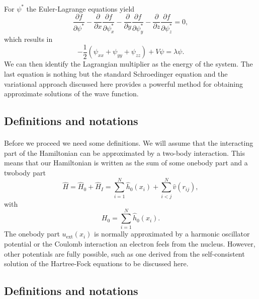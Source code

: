 \documentclass[%
twoside,                 %
final,                   %
10pt]{article}
\begin{document}
\paragraph{}
For $\psi^*$ the Euler-Lagrange  equations yield
\[
\frac{\partial f}{\partial \psi^*}- \frac{\partial }{\partial x}\frac{\partial f}{\partial \psi^*_x}-\frac{\partial }{\partial y}\frac{\partial f}{\partial \psi^*_y}-\frac{\partial }{\partial z}\frac{\partial f}{\partial \psi^*_z}=0,
\] 
which results in 
\[
    -\frac{1}{2}(\psi_{xx}+\psi_{yy}+\psi_{zz})+V\psi=\lambda \psi.
\]
We can then identify the  Lagrangian multiplier as the energy of the system. The last equation is 
nothing but the standard 
Schroedinger equation and the variational  approach discussed here provides 
a powerful method for obtaining approximate solutions of the wave function.






\subsection*{Definitions and notations}

\paragraph{}
Before we proceed we need some definitions.
We will assume that the interacting part of the Hamiltonian
can be approximated by a two-body interaction.
This means that our Hamiltonian is written as the sum of some onebody part and a twobody part
\begin{equation}
    \hat{H} = \hat{H}_0 + \hat{H}_I 
    = \sum_{i=1}^N \hat{h}_0(x_i) + \sum_{i < j}^N \hat{v}(r_{ij}),
\label{Hnuclei}
\end{equation}
with 
\begin{equation}
  H_0=\sum_{i=1}^N \hat{h}_0(x_i).
\label{hinuclei}
\end{equation}
The onebody part $u_{\mathrm{ext}}(x_i)$ is normally approximated by a harmonic oscillator potential or the Coulomb interaction an electron feels from the nucleus. However, other potentials are fully possible, such as 
one derived from the self-consistent solution of the Hartree-Fock equations to be discussed here.




\subsection*{Definitions and notations}
\end{document}
